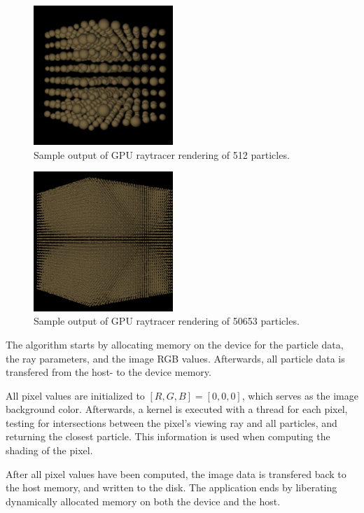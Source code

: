 \documentclass[journal]{IEEEtran}
\begin{document}
\begin{figure}[!t]
\centering
\includegraphics[width=0.47\textwidth]{np500.png}
\caption{Sample output of GPU raytracer rendering of \num{512} particles.}
\label{fig:np500.png}
\end{figure}


\begin{figure}[!t]
\centering
\includegraphics[width=0.47\textwidth]{np50000.png}
\caption{Sample output of GPU raytracer rendering of \num{50653} particles.}
\label{fig:np50000.png}
\end{figure}

The algorithm starts by allocating memory on the device for the particle data, the ray parameters, and the image RGB values. Afterwards, all particle data is transfered from the host- to the device memory.

All pixel values are initialized to $[R,G,B] = [0,0,0]$, which serves as the image background color. Afterwards, a kernel is executed with a thread for each pixel, testing for intersections between the pixel's viewing ray and all particles, and returning the closest particle. This information is used when computing the shading of the pixel. 

After all pixel values have been computed, the image data is transfered back to the host memory, and written to the disk. The application ends by liberating dynamically allocated memory on both the device and the host.
\end{document}
